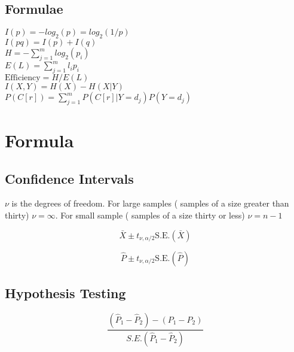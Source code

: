 \subsection{Formulae}

$I(p) = - log_{2}(p) = log_{2}(1/p)$\\

$I(pq) = I(p) + I(q)$\\

$H = - \sum_{j=1}^{m} log_{2}(p_{i})$\\

$E(L) = \sum_{j=1}^{m} l_{i} p_{i}$\\

$\mbox{Efficiency} = H / E(L)$\\

$I(X,Y) = H(X) - H(X|Y)$\\

$P(C[r]) = \sum_{j=1}^{m}P(C[r]|Y=d_{j} )P(Y=d_{j} )$


\section{Formula}
		
		\subsection{Confidence Intervals}
		
		$\nu$ is the degrees of freedom. For large samples ( samples of a
		size greater than thirty) $\nu = \infty$. For small sample (
		samples of a size thirty or less)  $\nu = n-1$
		
		\begin{equation}
		\bar{X} \pm t_{\nu,\alpha/2}\mbox{S.E.}(\bar{X})
		\end{equation}
		
		\begin{equation}
		\hat{P} \pm t_{\nu,\alpha/2}\mbox{S.E.}(\hat{P})
		\end{equation}
		
		\subsection{Hypothesis Testing}
		\begin{equation}
		\frac{(\hat{P}_{1}-\hat{P}_{2})-(P_{1}-P_{2})}{S.E.(\hat{P}_{1}-\hat{P}_{2})}
		\end{equation}
		
